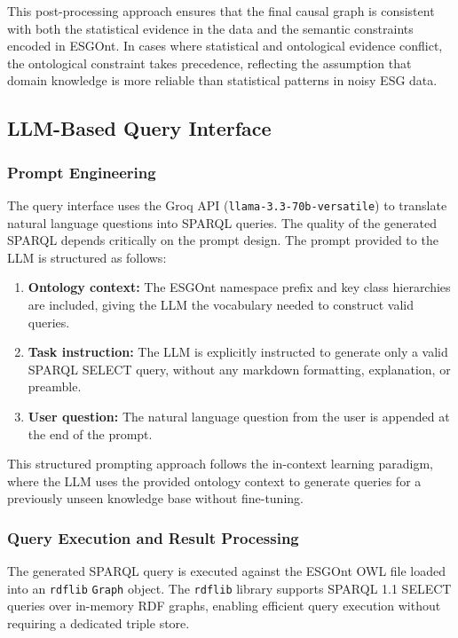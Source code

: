 \documentclass[a4paper,11pt,oneside]{article}
\begin{document}
This post-processing approach ensures that the final causal graph is consistent with both the statistical evidence in the data and the semantic constraints encoded in ESGOnt. In cases where statistical and ontological evidence conflict, the ontological constraint takes precedence, reflecting the assumption that domain knowledge is more reliable than statistical patterns in noisy ESG data.

\subsection{LLM-Based Query Interface}

\subsubsection{Prompt Engineering}

The query interface uses the Groq API (\texttt{llama-3.3-70b-versatile}) to translate natural language questions into SPARQL queries. The quality of the generated SPARQL depends critically on the prompt design. The prompt provided to the LLM is structured as follows:

\begin{enumerate}
    \item \textbf{Ontology context:} The ESGOnt namespace prefix and key class hierarchies are included, giving the LLM the vocabulary needed to construct valid queries.
    \item \textbf{Task instruction:} The LLM is explicitly instructed to generate only a valid SPARQL SELECT query, without any markdown formatting, explanation, or preamble.
    \item \textbf{User question:} The natural language question from the user is appended at the end of the prompt.
\end{enumerate}

This structured prompting approach follows the in-context learning paradigm, where the LLM uses the provided ontology context to generate queries for a previously unseen knowledge base without fine-tuning.

\subsubsection{Query Execution and Result Processing}

The generated SPARQL query is executed against the ESGOnt OWL file loaded into an \texttt{rdflib} \texttt{Graph} object. The \texttt{rdflib} library supports SPARQL 1.1 SELECT queries over in-memory RDF graphs, enabling efficient query execution without requiring a dedicated triple store.
\end{document}
